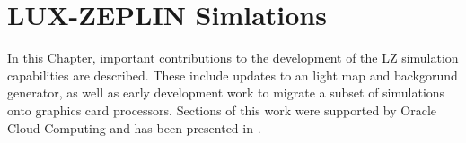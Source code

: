 \chapter{LUX-ZEPLIN Simlations}
\par
In this Chapter, important contributions to the development of the LZ simulation capabilities are described.
These include updates to an light map and backgorund generator, as well as early development work to migrate a subset of simulations onto graphics card processors.
Sections of this work were supported by Oracle Cloud Computing and has been presented in \cite{se_poster_2018,se_poster_2019_summerschool,se_poster_2019_bristol,SEriksen_IoP_2021_talk_ref}.





